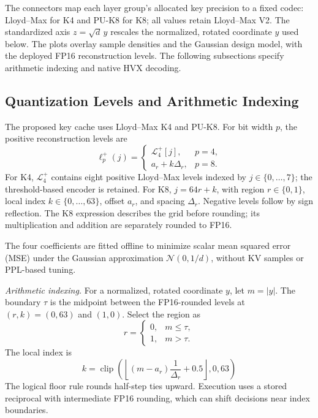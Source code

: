 \documentclass[conference,a4paper,10pt]{IEEEtran}
\newcommand{\clip}{\operatorname{clip}}
\begin{document}
The connectors map each layer group's allocated key precision to a fixed codec: Lloyd--Max for K4 and PU-K8 for K8; all values retain Lloyd--Max V2. The standardized axis $z=\sqrt{d}\,y$ rescales the normalized, rotated coordinate $y$ used below. The plots overlay sample densities and the Gaussian design model, with the deployed FP16 reconstruction levels. The following subsections specify arithmetic indexing and native HVX decoding.

\subsection{Quantization Levels and Arithmetic Indexing}
The proposed key cache uses Lloyd--Max K4 and PU-K8. For bit width $p$, the positive reconstruction levels are
\begin{equation}
 \boxed{\ell_p^+(j)=\begin{cases}
  \mathcal{L}_4^+[j],&p=4,\\
  a_r+k\Delta_r,&p=8.
 \end{cases}}
 \label{eq:level}
\end{equation}
For K4, $\mathcal{L}_4^+$ contains eight positive Lloyd--Max levels indexed by $j\in\{0,\ldots,7\}$; the threshold-based encoder is retained. For K8, $j=64r+k$, with region $r\in\{0,1\}$, local index $k\in\{0,\ldots,63\}$, offset $a_r$, and spacing $\Delta_r$. Negative levels follow by sign reflection. The K8 expression describes the grid before rounding; its multiplication and addition are separately rounded to FP16.

The four coefficients are fitted offline to minimize scalar mean squared error (MSE) under the Gaussian approximation $\mathcal{N}(0,1/d)$, without KV samples or PPL-based tuning.

\emph{Arithmetic indexing.} For a normalized, rotated coordinate $y$, let $m=|y|$. The boundary $\tau$ is the midpoint between the FP16-rounded levels at $(r,k)=(0,63)$ and $(1,0)$. Select the region as
\begin{equation}
 \boxed{r=\begin{cases}
  0,&m\leq\tau,\\
  1,&m>\tau.
 \end{cases}}
 \label{eq:region}
\end{equation}
The local index is
\begin{equation}
 \boxed{k=\clip\!\left(\left\lfloor(m-a_r)\dfrac{1}{\Delta_r}+0.5\right\rfloor,0,63\right)}
 \label{eq:index}
\end{equation}
The logical floor rule rounds half-step ties upward. Execution uses a stored reciprocal with intermediate FP16 rounding, which can shift decisions near index boundaries.
\end{document}
